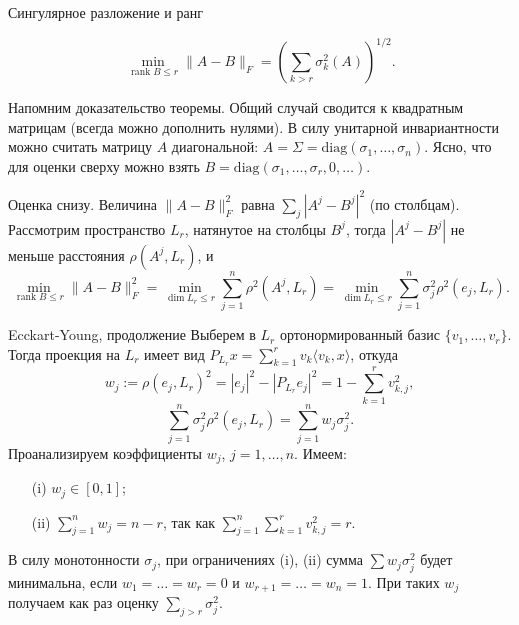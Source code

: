 \documentclass[12pt,handout]{beamer}
\renewcommand\le{\leqslant}
\DeclareMathOperator{\rank}{rank}
\begin{document}
\begin{frame}{Сингулярное разложение и ранг}

    \begin{theorem}
        $$
        \min_{\rank B\le r}\|A-B\|_F = (\sum_{k>r}\sigma_k^2(A))^{1/2}.
        $$
    \end{theorem}

    Напомним доказательство теоремы.
        Общий случай сводится к квадратным матрицам (всегда можно дополнить
        нулями).  В силу унитарной инвариантности можно считать матрицу $A$ диагональной:
        $A=\Sigma=\mathrm{diag}(\sigma_1,\ldots,\sigma_n)$. Ясно, что для оценки
        сверху можно взять $B=\mathrm{diag}(\sigma_1,\ldots,\sigma_r,0,\ldots)$. 

        Оценка снизу.
        Величина $\|A-B\|_F^2$ равна $\sum_j|A^j-B^j|^2$ (по столбцам).
        Рассмотрим пространство $L_r$, натянутое на столбцы $B^j$, тогда
        $|A^j-B^j|$ не меньше расстояния $\rho(A^j,L_r)$, и
        $$
        \min_{\rank B\le r}\|A-B\|_F^2 = \min_{\dim L_r\le r}\sum_{j=1}^n
        \rho^2(A^j,L_r) = \min_{\dim L_r\le r}\sum_{j=1}^n \sigma_j^2
        \rho^2(e_j,L_r).
        $$

\end{frame}

\begin{frame}{Ecckart-Young, продолжение}
    Выберем в $L_r$ ортонормированный базис $\{v_1,\ldots,v_r\}$. Тогда проекция
    на $L_r$ имеет вид $P_{L_r}x=\sum_{k=1}^r v_k\langle v_k,x\rangle$, откуда
    $$
    w_j := \rho(e_j,L_r)^2 = |e_j|^2 - |P_{L_r}e_j|^2 = 1 - \sum_{k=1}^r v_{k,j}^2,
    $$
    $$
    \sum_{j=1}^n \sigma_j^2 \rho^2(e_j,L_r) = \sum_{j=1}^n w_j \sigma_j^2.
    $$
    Проанализируем коэффициенты $w_j$, $j=1,\ldots,n$. Имеем:
    \begin{itemize}
        \item[(i)] $w_j\in[0,1]$;
        \item[(ii)] $\sum_{j=1}^n w_j = n - r$, так как $\sum_{j=1}^n\sum_{k=1}^r v_{k,j}^2 = r$.
    \end{itemize}

    В силу монотонности $\sigma_j$, при ограничениях (i), (ii) сумма $\sum
    w_j\sigma_j^2$ будет минимальна, если $w_1=\ldots=w_r=0$ и
    $w_{r+1}=\ldots=w_{n}=1$. При таких $w_j$ получаем как раз оценку
    $\sum_{j>r}\sigma_j^2$.

\end{frame}
\end{document}
